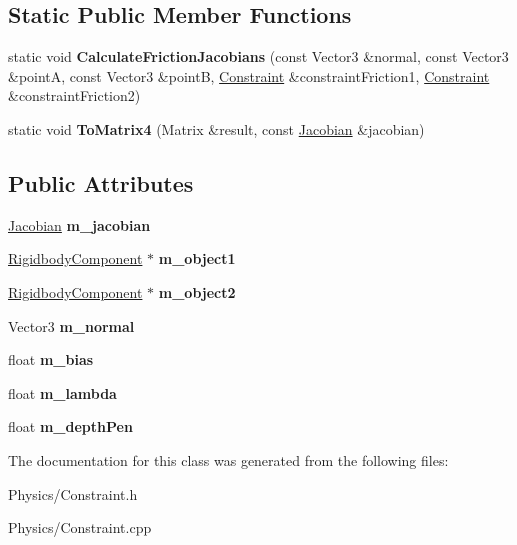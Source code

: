 \subsection*{Static Public Member Functions}
\begin{DoxyCompactItemize}
\item 
\mbox{\label{classConstraint_ad59276ed90da13e5169f411a0b51329d}} 
static void {\bfseries Calculate\+Friction\+Jacobians} (const Vector3 \&normal, const Vector3 \&pointA, const Vector3 \&pointB, \hyperlink{classConstraint}{Constraint} \&constraint\+Friction1, \hyperlink{classConstraint}{Constraint} \&constraint\+Friction2)
\item 
\mbox{\label{classConstraint_ae458b57a23e5c4f49654ac8fbb37b3e8}} 
static void {\bfseries To\+Matrix4} (Matrix \&result, const \hyperlink{classJacobian}{Jacobian} \&jacobian)
\end{DoxyCompactItemize}
\subsection*{Public Attributes}
\begin{DoxyCompactItemize}
\item 
\mbox{\label{classConstraint_a81be9de1b027d83afc88075cac8b5b4b}} 
\hyperlink{classJacobian}{Jacobian} {\bfseries m\+\_\+jacobian}
\item 
\mbox{\label{classConstraint_a9bbea2866cb6f593f7be5422357ef43f}} 
\hyperlink{classRigidbodyComponent}{Rigidbody\+Component} $\ast$ {\bfseries m\+\_\+object1}
\item 
\mbox{\label{classConstraint_a927b633621d426d3d049fe9e44b8bae1}} 
\hyperlink{classRigidbodyComponent}{Rigidbody\+Component} $\ast$ {\bfseries m\+\_\+object2}
\item 
\mbox{\label{classConstraint_aaabf19e98bae7a66b87d8a726316b20a}} 
Vector3 {\bfseries m\+\_\+normal}
\item 
\mbox{\label{classConstraint_a4f7dae1972c717b15fa22a255bcb12f6}} 
float {\bfseries m\+\_\+bias}
\item 
\mbox{\label{classConstraint_a4e856baff516350a810ea3bf0a840450}} 
float {\bfseries m\+\_\+lambda}
\item 
\mbox{\label{classConstraint_ac3fdb5d9607837f03830b1874649a1cf}} 
float {\bfseries m\+\_\+depth\+Pen}
\end{DoxyCompactItemize}


The documentation for this class was generated from the following files\+:\begin{DoxyCompactItemize}
\item 
Physics/Constraint.\+h\item 
Physics/Constraint.\+cpp\end{DoxyCompactItemize}
